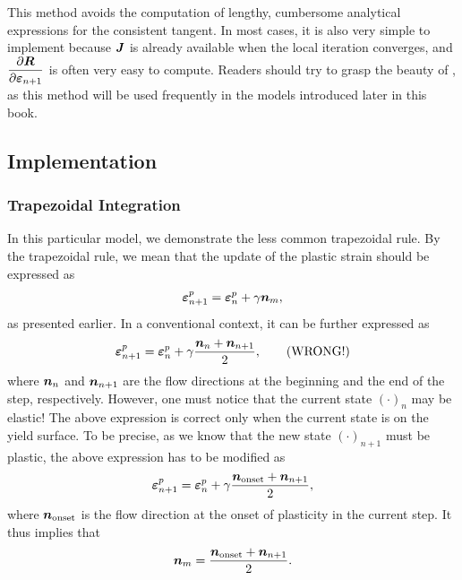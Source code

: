 This method avoids the computation of lengthy, cumbersome analytical expressions for the consistent tangent.
In most cases, it is also very simple to implement because $\bm{J}$ is already available when the local iteration converges, and $\dfrac{\partial{\bm{R}}}{\partial{\bm{\varepsilon}_{n+1}}}$ is often very easy to compute.
Readers should try to grasp the beauty of , as this method will be used frequently in the models introduced later in this book.
\subsection{Implementation}
\subsubsection{Trapezoidal Integration}
In this particular model, we demonstrate the less common trapezoidal rule.
By the trapezoidal rule, we mean that the update of the plastic strain should be expressed as
\begin{gather}
    \bm{\varepsilon}^p_{n+1}=\bm{\varepsilon}^p_{n}+\gamma\bm{n}_{m},
\end{gather}
as presented earlier.
In a conventional context, it can be further expressed as
\begin{gather}
    \bm{\varepsilon}^p_{n+1}=\bm{\varepsilon}^p_{n}+\gamma\dfrac{\bm{n}_{n}+\bm{n}_{n+1}}{2},\qquad\text{(WRONG!)}
\end{gather}
where $\bm{n}_{n}$ and $\bm{n}_{n+1}$ are the flow directions at the beginning and the end of the step, respectively.
However, one must notice that the current state $\left(\cdot\right)_n$ may be elastic!
The above expression is correct only when the current state is on the yield surface.
To be precise, as we know that the new state $\left(\cdot\right)_{n+1}$ must be plastic, the above expression has to be modified as
\begin{gather}
    \bm{\varepsilon}^p_{n+1}=\bm{\varepsilon}^p_{n}+\gamma\dfrac{\bm{n}_\text{onset}+\bm{n}_{n+1}}{2},
\end{gather}
where $\bm{n}_\text{onset}$ is the flow direction at the onset of plasticity in the current step.
It thus implies that
\begin{gather}
    \bm{n}_{m}=\dfrac{\bm{n}_\text{onset}+\bm{n}_{n+1}}{2}.
\end{gather}

